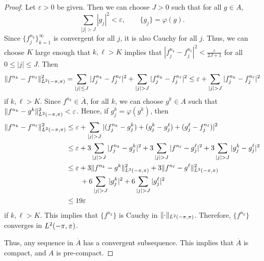 \documentclass{homework}
\begin{document}
\begin{arabicparts}
\begin{proof}
			Let $\varepsilon > 0$ be given. Then we can choose $J > 0$ such that for all $g \in A$,
			\begin{equation}
				\sum_{|j| > J}|g_j|^2 < \varepsilon, \qquad \{g_j\} = \varphi(g).
			\end{equation}
			Since $\{f^{n_k}_j\}_{k=1}^\infty$ is convergent for all $j$, it is also Cauchy for all $j$. Thus, we can choose $K$ large enough that $k,\ell > K$ implies that $|f^{n_k}_j - f^{n_\ell}_j|^2 < \frac{\varepsilon}{2J+1}$ for all $0 \le |j| \le J$. Then
			\begin{equation}
				\lVert f^{n_k} - f^{n_\ell}\rVert_\ltwo^2 = \sum_{|j| \le J}|f^{n_k}_j - f^{n_\ell}_j|^2 + \sum_{|j|>J}|f^{n_k}_j - f^{n_\ell}_j|^2 \le \varepsilon + \sum_{|j|>J}|f^{n_k}_j - f^{n_\ell}_j|^2
			\end{equation}
			if $k,\ell > K$. Since $f^{n_k} \in \overline{A}$, for all $k$, we can choose $g^k \in A$ such that $\lVert f^{n_k} - g^k\rVert_{L^2(-\pi,\pi)}^2 < \varepsilon$. Hence, if ${g^k_j} = \varphi(g^k)$, then
			\begin{align}
				\lVert f^{n_k} - f^{n_\ell}\rVert_\ltwo^2 &\le \varepsilon + \sum_{|j|>J} |(f^{n_k}_j - g^k_j) + (g^k_j - g^\ell_j) + (g^\ell_j - f^{n_\ell}_j)|^2\\
				&\le \varepsilon + 3\sum_{|j|>J}|f^{n_k}_j - g^k_j|^2 + 3\sum_{|j|>J}|f^{n_\ell}-g^\ell_j|^2 + 3\sum_{|j|>J}|g^k_j-g^\ell_j|^2\\
				&\le \varepsilon + 3\lVert f^{n_k} - g^k\rVert_\ltwo^2 + 3\lVert f^{n_\ell}-g^\ell\rVert_\ltwo^2 \\
				&\qquad{}+ 6\sum_{|j|>J}|g^k_j|^2 + 6\sum_{|j|>J}|g^\ell_j|^2\\
				&\le 19\varepsilon
			\end{align}
			if $k,\ell > K$. This implies that $\{f^{n_k}\}$ is Cauchy in $\lVert\cdot\rVert_{L^2(-\pi,\pi)}$. Therefore, $\{f^{n_k}\}$ converges in ${L^2(-\pi,\pi)}$.
			
			Thus, any sequence in $\overline{A}$ has a convergent subsequence. This implies that $\overline{A}$ is compact, and $A$ is pre-compact.
		\end{proof}
	\end{arabicparts}
\end{document}
